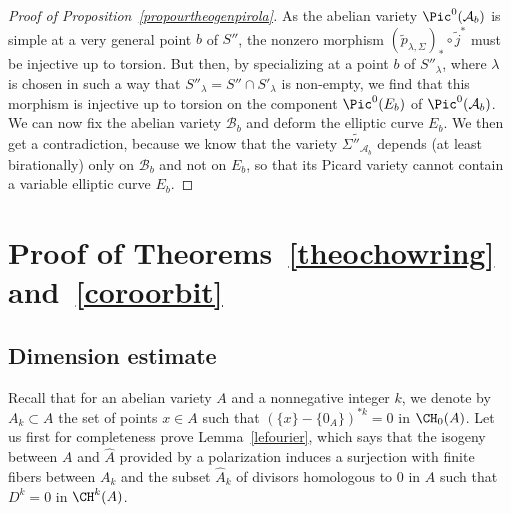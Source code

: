 \begin{proof}[Proof of Proposition~\ref{propourtheogenpirola}]
As the abelian variety $\Pic^0(\mathcal{A}_b)$ is simple at a very general point $b$ of $S''$, the nonzero morphism $(\tilde{p}_{\lambda,\Sigma})_*\circ \tilde{j}^*$ must be injective up to torsion. But then, by specializing at a point $b$ of $S''_\lambda$, where $\lambda$ is chosen in such a way that $S''_\lambda=S''\cap S'_\lambda$ is non-empty, we find that this morphism is injective up to torsion on the component $\Pic^0(E_b)$ of $\Pic^0(\mathcal{A}_b)$. We can now fix the abelian variety $\mathcal{B}_b$ and deform the elliptic curve $E_b$. We then get a contradiction, because we know that the variety $\widetilde{\Sigma''_{\mathcal{A}_{b}}}$ depends (at least birationally) only on $\mathcal{B}_b$ and not on $E_b$, so that its Picard variety cannot contain a variable elliptic curve $E_b$.
\end{proof}


\section{Proof of Theorems~\ref{theochowring} and~\ref{coroorbit}\tMK{(\ref{1.4.4})}}\label{secproofcoriv}

\subsection{Dimension estimate}\label{secdimestimate}

Recall that for an abelian variety $A$ and a nonnegative integer $k$, we denote by $A_k\subset A$ the set of points $x\in A$ such that $(\{x\}-\{0_A\})^{*k}=0$ in $\CH_0(A)$. Let us first for completeness prove Lemma~\ref{lefourier}, which says that the isogeny between $A$ and $\widehat{A}$ provided by a polarization induces a surjection with finite fibers between $A_k$ and the subset $\widehat{A}_k$ of divisors homologous to $0$ in $A$ such that $D^k=0$ in $\CH^k(A)$.

